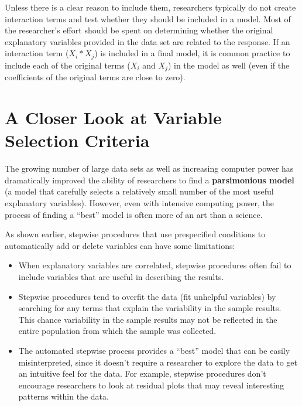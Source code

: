 \documentclass[
]{report}
\begin{document}
Unless there is a clear reason to include them, researchers typically do not create interaction terms and test whether they should be included in a model. Most of the researcher's effort should be spent on determining whether the original explanatory variables provided in the data set are related to the response. If an interaction term (\(X_i * X_j\)) is included in a final model, it is common practice to include each of the original terms (\(X_i\) and \(X_j\)) in the model as well (even if the coefficients of the original terms are close to zero).

\hypertarget{a-closer-look-at-variable-selection-criteria}{%
\section{\texorpdfstring{\textbf{A Closer Look at Variable Selection Criteria}}{A Closer Look at Variable Selection Criteria}}\label{a-closer-look-at-variable-selection-criteria}}

The growing number of large data sets as well as increasing computer power has dramatically improved the ability of researchers to find a \textbf{parsimonious model} (a model that carefully selects a relatively small number of the most useful explanatory variables). However, even with intensive computing power, the process of finding a ``best'' model is often more of an art than a science.

As shown earlier, stepwise procedures that use prespecified conditions to automatically add or delete variables can have some limitations:

\begin{itemize}
\item
  When explanatory variables are correlated, stepwise procedures often fail to include variables that are useful in describing the results.
\item
  Stepwise procedures tend to overfit the data (fit unhelpful variables) by searching for any terms that explain the variability in the sample results. This chance variability in the sample results may not be reflected in the entire population from which the sample was collected.
\item
  The automated stepwise process provides a ``best'' model that can be easily misinterpreted, since it doesn't require a researcher to explore the data to get an intuitive feel for the data. For example, stepwise procedures don't encourage researchers to look at residual plots that may reveal interesting patterns within the data.
\end{itemize}
\end{document}
